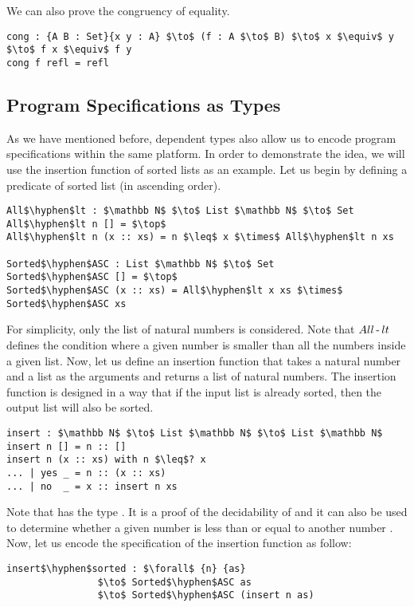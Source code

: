 \par We can also prove the congruency of equality.
\begin{lstlisting}[mathescape=true,xleftmargin=.3\textwidth]
cong : {A B : Set}{x y : A} $\to$ (f : A $\to$ B) $\to$ x $\equiv$ y $\to$ f x $\equiv$ f y
cong f refl = refl
\end{lstlisting}


\subsection{Program Specifications as Types}
\par As we have mentioned before, dependent types also allow us to encode program
specifications within the same platform. In order to demonstrate the
idea, we will use the insertion function of sorted lists as an
example. Let us begin by defining a predicate
of sorted list (in ascending order). 
\begin{lstlisting}[mathescape=true,xleftmargin=.3\textwidth]
All$\hyphen$lt : $\mathbb N$ $\to$ List $\mathbb N$ $\to$ Set
All$\hyphen$lt n [] = $\top$
All$\hyphen$lt n (x :: xs) = n $\leq$ x $\times$ All$\hyphen$lt n xs

Sorted$\hyphen$ASC : List $\mathbb N$ $\to$ Set
Sorted$\hyphen$ASC [] = $\top$
Sorted$\hyphen$ASC (x :: xs) = All$\hyphen$lt x xs $\times$ Sorted$\hyphen$ASC xs
\end{lstlisting}

\par For simplicity, only the list of natural numbers is
considered. Note that \(All\operatorname{-} lt\) defines the condition where a given
number is smaller than all the numbers inside a given list. Now, let
us define an insertion function that takes a natural number and a list as the arguments and returns a list of
natural numbers. The insertion function is designed in a way that if the
input list is already sorted, then the output list will also be sorted. 
\begin{lstlisting}[mathescape=true,xleftmargin=.3\textwidth]
insert : $\mathbb N$ $\to$ List $\mathbb N$ $\to$ List $\mathbb N$
insert n [] = n :: []
insert n (x :: xs) with n $\leq$? x
... | yes _ = n :: (x :: xs)
... | no  _ = x :: insert n xs
\end{lstlisting}

\par Note that  has the type . It is a proof of the decidability of \mb{\_\leq\_} and it can also be used to determine whether
a given number  is less than or equal to another number
. Now, let us encode the specification of the insertion function
as follow: 
\begin{lstlisting}[mathescape=true,xleftmargin=.3\textwidth]
insert$\hyphen$sorted : $\forall$ {n} {as} 
                $\to$ Sorted$\hyphen$ASC as 
                $\to$ Sorted$\hyphen$ASC (insert n as)
\end{lstlisting}

